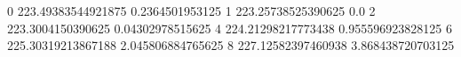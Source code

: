 0 223.49383544921875 0.2364501953125
1 223.25738525390625 0.0
2 223.3004150390625 0.04302978515625
4 224.21298217773438 0.955596923828125
6 225.30319213867188 2.045806884765625
8 227.12582397460938 3.868438720703125
